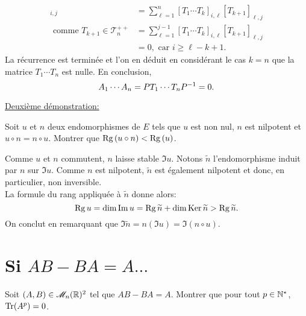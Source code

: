 \begin{solution}
\begin{enumerate}
\begin{itemize}
\begin{align*}
                [T_1 \cdots T_{k+1}]_{i,j} &= \sum_{\ell=1}^n [T_1 \cdots T_k]_{i, \ell} [T_{k+1}]_{\ell, j} \\
                \text{ comme } T_{k+1} \in \mathscr{T}_n^{++} &= \sum_{\ell=1}^{j-1} [T_1 \cdots T_k]_{i, \ell} [T_{k+1}]_{\ell, j} \\
                &= 0, \text{ car } i \geqslant \ell - k +1.
            \end{align*}
            La récurrence est terminée et l'on en déduit en considérant le cas $k = n$ que la matrice $T_1 \cdots T_n$ est nulle. En conclusion,
            $$A_1 \cdots A_n = P T_1 \cdots T_n P^{-1} = 0.$$
        \end{itemize}
        \underline{Deuxième démonstration:} \\
        \begin{lemme}
            Soit $u$ et $n$ deux endomorphismes de $E$ tels que $u$ est non nul, $n$ est nilpotent et $u \circ n = n \circ u$. Montrer que $\mathrm{Rg}\,(u \circ n) < \mathrm{Rg}\,(u)$.
        \end{lemme}
        \begin{preuve}
            Comme $u$ et $n$ commutent, $n$ laisse stable $\Im u$. Notons $\widetilde{n}$ l'endomorphisme induit par $n$ sur $\Im u$. Comme $n$ est nilpotent, $\widetilde{n}$ est également nilpotent et donc, en particulier, non inversible. \\
            La formule du rang appliquée à $\widetilde{n}$ donne alors:
            $$\mathrm{Rg}\, u = \dim \Im u = \mathrm{Rg}\, \widetilde{n} + \dim \mathrm{Ker}\, \widetilde{n} > \mathrm{Rg}\, \widetilde{n}.$$
            On conclut en remarquant que $\Im \widetilde{n} = n(\Im u) = \Im (n \circ u)$.
        \end{preuve}
    \end{enumerate}
\end{solution}


\section{Si \texorpdfstring{$AB - BA = A \dots$}{AB-BA=A...}}
\begin{exercice}
    Soit $(A, B) \in \mathscr{M}_n(\mathbb{R})^2$ tel que $AB-BA=A$. Montrer que pour tout $p \in \mathbb{N}^\star$, $\mathrm{Tr}(A^p) = 0$.
\end{exercice}



